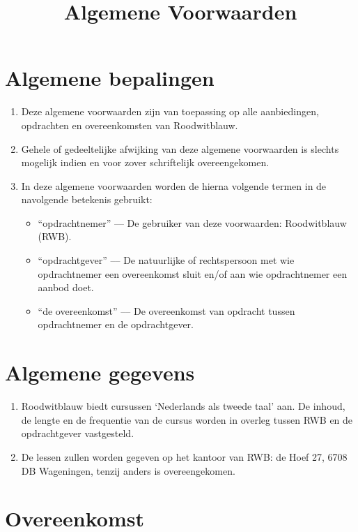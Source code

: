 \documentclass[a4paper]{article}
\begin{document}
\title{Algemene Voorwaarden}
\date{}
\maketitle

\section{Algemene bepalingen}

\begin{enumerate}
	\item Deze algemene voorwaarden zijn van toepassing op alle aanbiedingen, opdrachten en overeenkomsten van Roodwitblauw.
	\item Gehele of gedeeltelijke afwijking van deze algemene voorwaarden is slechts mogelijk indien en voor zover schriftelijk overeengekomen.
	\item In deze algemene voorwaarden worden de hierna volgende termen in de navolgende betekenis gebruikt:
	\begin{itemize}
		\item ``opdrachtnemer'' –-- De gebruiker van deze voorwaarden: Roodwitblauw (RWB).
		\item ``opdrachtgever'' –-- De natuurlijke of rechtspersoon met wie opdrachtnemer een overeenkomst sluit en/of aan wie opdrachtnemer een aanbod doet.
		\item ``de overeenkomst'' --– De overeenkomst van opdracht tussen opdrachtnemer en de opdrachtgever.
	\end{itemize}
\end{enumerate}

\section{Algemene gegevens}

\begin{enumerate}
	\item Roodwitblauw  biedt cursussen ‘Nederlands als tweede taal’ aan. De inhoud, de lengte en de frequentie van de cursus worden in overleg tussen RWB en de opdrachtgever vastgesteld.
	\item De lessen zullen worden gegeven op het kantoor van RWB: de Hoef 27, 6708 DB Wageningen, tenzij anders is overeengekomen.
\end{enumerate}

\section{Overeenkomst}
\end{document}
